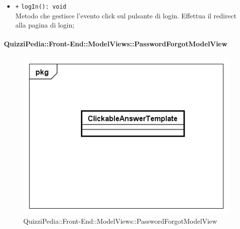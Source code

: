 \begin{itemize}
\begin{itemize}
			\item \texttt{+} \texttt{logIn(): void} \\
			Metodo che gestisce l’evento click sul pulsante di login. Effettua il redirect alla pagina di login;
		\end{itemize}
	\end{itemize}
	
	\paragraph{QuizziPedia::Front-End::ModelViews::PasswordForgotModelView}
	
	\label{QuizziPedia::Front-End::ModelViews::PasswordForgotModelView}
	
	\begin{figure}[ht]
		\centering
		\includegraphics[scale=0.5,keepaspectratio]{UML/Classi/Front-End/QuizziPedia_Front-end_Templates_ClickableAnswerTemplate.png}
		\caption{QuizziPedia::Front-End::ModelViews::PasswordForgotModelView}
	\end{figure} \FloatBarrier
	
